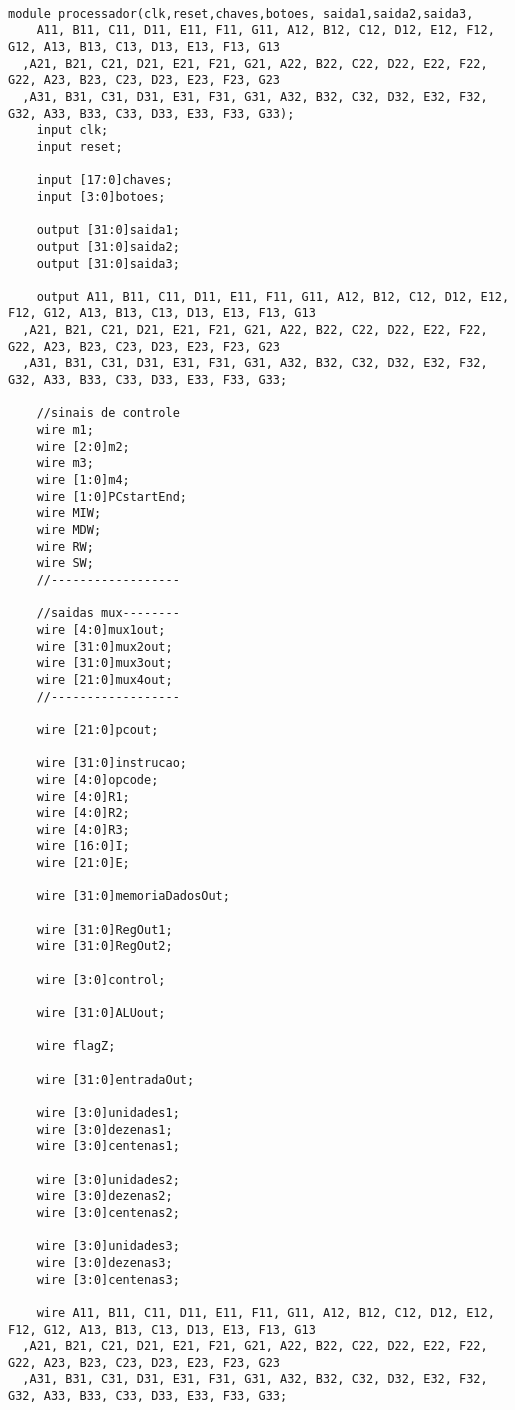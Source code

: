 \begin{lstlisting}

module processador(clk,reset,chaves,botoes, saida1,saida2,saida3,
	A11, B11, C11, D11, E11, F11, G11, A12, B12, C12, D12, E12, F12, G12, A13, B13, C13, D13, E13, F13, G13
  ,A21, B21, C21, D21, E21, F21, G21, A22, B22, C22, D22, E22, F22, G22, A23, B23, C23, D23, E23, F23, G23
  ,A31, B31, C31, D31, E31, F31, G31, A32, B32, C32, D32, E32, F32, G32, A33, B33, C33, D33, E33, F33, G33);
	input clk;
	input reset;
	
	input [17:0]chaves;
	input [3:0]botoes;
	
	output [31:0]saida1;
	output [31:0]saida2;
	output [31:0]saida3;
	
	output A11, B11, C11, D11, E11, F11, G11, A12, B12, C12, D12, E12, F12, G12, A13, B13, C13, D13, E13, F13, G13
  ,A21, B21, C21, D21, E21, F21, G21, A22, B22, C22, D22, E22, F22, G22, A23, B23, C23, D23, E23, F23, G23
  ,A31, B31, C31, D31, E31, F31, G31, A32, B32, C32, D32, E32, F32, G32, A33, B33, C33, D33, E33, F33, G33;
	
	//sinais de controle
	wire m1;
	wire [2:0]m2;
	wire m3;
	wire [1:0]m4;
	wire [1:0]PCstartEnd;
	wire MIW;
	wire MDW;
	wire RW;
	wire SW;
	//------------------
	
	//saidas mux--------
	wire [4:0]mux1out;
	wire [31:0]mux2out;
	wire [31:0]mux3out;
	wire [21:0]mux4out;
	//------------------
	
	wire [21:0]pcout;
	
	wire [31:0]instrucao;
	wire [4:0]opcode;
	wire [4:0]R1;
	wire [4:0]R2;
	wire [4:0]R3;
	wire [16:0]I;
	wire [21:0]E;
	
	wire [31:0]memoriaDadosOut;
	
	wire [31:0]RegOut1;
	wire [31:0]RegOut2;
	
	wire [3:0]control;

	wire [31:0]ALUout;
	
	wire flagZ;
	
	wire [31:0]entradaOut;
	
	wire [3:0]unidades1;
	wire [3:0]dezenas1;
	wire [3:0]centenas1;
	
	wire [3:0]unidades2;
	wire [3:0]dezenas2;
	wire [3:0]centenas2;
	
	wire [3:0]unidades3;
	wire [3:0]dezenas3;
	wire [3:0]centenas3;
	
	wire A11, B11, C11, D11, E11, F11, G11, A12, B12, C12, D12, E12, F12, G12, A13, B13, C13, D13, E13, F13, G13
  ,A21, B21, C21, D21, E21, F21, G21, A22, B22, C22, D22, E22, F22, G22, A23, B23, C23, D23, E23, F23, G23
  ,A31, B31, C31, D31, E31, F31, G31, A32, B32, C32, D32, E32, F32, G32, A33, B33, C33, D33, E33, F33, G33;
	

\end{lstlisting}
